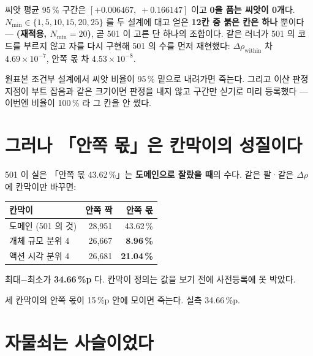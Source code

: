 \documentclass[10pt]{article}
\begin{document}
씨앗 평균 95\,\% 구간은 $[+0.006467,\;+0.166147]$ 이고 \textbf{0을 품는 씨앗이 0개}다.
$N_{\min}\in\{1,5,10,15,20,25\}$ 를 두 설계에 대고 얻은 \textbf{12칸 중 붉은 칸은 하나}
뿐이다 --- \textbf{(재적용, $N_{\min}=20$)}, 곧 501 이 고른 단 하나의 조합이다.
같은 러너가 501 의 코드를 부르지 않고 자를 다시 구현해 501 의 수를 먼저 재현했다:
$\Delta\rho_{\text{within}}$ 차 $4.69\times10^{-7}$, 안쪽 몫 차 $4.53\times10^{-8}$.

{원표본 조건부 설계에서 씨앗 비율이 95\,\% 밑으로 내려가면 죽는다. 그리고 이산 판정
지점이 부트 잡음과 같은 크기이면 판정을 내지 않고 구간만 싣기로 미리 등록했다 --- 이번엔
비율이 100\,\% 라 그 칸을 안 썼다.}

\section{그러나 「안쪽 몫」은 칸막이의 성질이다}

501 이 실은 「안쪽 몫 43.62\,\%」는 \textbf{도메인으로 잘랐을 때}의 수다. 같은 팔·같은
$\Delta\rho$ 에 칸막이만 바꾸면:

\begin{center}\small
\begin{tabular}{lrr}
\hline
칸막이 & 안쪽 짝 & 안쪽 몫 \\
\hline
도메인 (501 의 것) & 28{,}951 & 43.62\,\% \\
개체 규모 분위 4 & 26{,}667 & \textbf{8.96\,\%} \\
액션 시각 분위 4 & 26{,}681 & \textbf{21.04\,\%} \\
\hline
\end{tabular}
\end{center}

최대$-$최소가 \textbf{34.66\,\%p} 다. 칸막이 정의는 값을 보기 전에 사전등록에 못 박았다.

{세 칸막이의 안쪽 몫이 15\,\%p 안에 모이면 죽는다. 실측 34.66\,\%p.}

\section{자물쇠는 사슬이었다}
\end{document}
